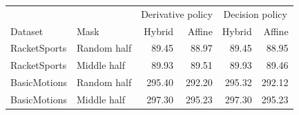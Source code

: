 \begin{tabular}{llrrrr}\toprule
 & & \multicolumn{2}{c}{Derivative policy} & \multicolumn{2}{c}{Decision policy} \\
Dataset & Mask & Hybrid & Affine & Hybrid & Affine \\\midrule
RacketSports & Random half & 89.45 & 88.97 & 89.45 & 88.95 \\
RacketSports & Middle half & 89.93 & 89.51 & 89.93 & 89.46 \\
BasicMotions & Random half & 295.40 & 292.20 & 295.32 & 292.12 \\
BasicMotions & Middle half & 297.30 & 295.23 & 297.30 & 295.23 \\
\bottomrule\end{tabular}
